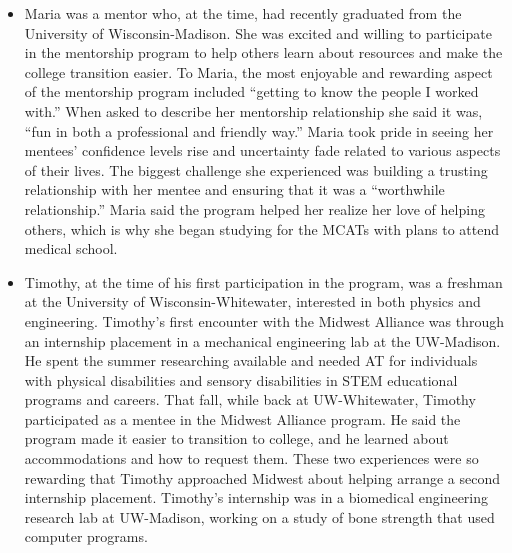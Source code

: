 \documentclass[11.5pt]{sig-alternate} %
\begin{document}
\begin{large}
\begin{itemize}
    \item Maria was a mentor who, at the time, had recently graduated from the University of Wisconsin-Madison. She was excited and willing to participate in the mentorship program to help others learn about resources and make the college transition easier. To Maria, the most enjoyable and rewarding aspect of the mentorship program included “getting to know the people I worked with.” When asked to describe her mentorship relationship she said it was, “fun in both a professional and friendly way.” Maria took pride in seeing her mentees' confidence levels rise and uncertainty fade related to various aspects of their lives. The biggest challenge she experienced was building a trusting relationship with her mentee and ensuring that it was a “worthwhile relationship.” Maria said the program helped her realize her love of helping others, which is why she began studying for the MCATs with plans to attend medical school.
    \item Timothy, at the time of his first participation in the program, was a freshman at the University of Wisconsin-Whitewater, interested in both physics and engineering. Timothy's first encounter with the Midwest Alliance was through an internship placement in a mechanical engineering lab at the UW-Madison. He spent the summer researching available and needed AT for individuals with physical disabilities and sensory disabilities in STEM educational programs and careers. That fall, while back at UW-Whitewater, Timothy participated as a mentee in the Midwest Alliance program. He said the program made it easier to transition to college, and he learned about accommodations and how to request them. These two experiences were so rewarding that Timothy approached Midwest about helping arrange a second internship placement. Timothy's internship was in a biomedical engineering research lab at UW-Madison, working on a study of bone strength that used computer programs.

\end{itemize}
\end{large}
\end{document}
